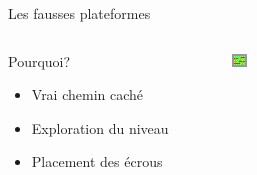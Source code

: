 \documentclass{beamer}
\begin{document}
{\begin{frame}{Les fausses plateformes}
    \begin{columns}
        \begin{block}{Pourquoi?}
            \begin{itemize}
                \item[\bullet] Vrai chemin caché
                \item[\bullet] Exploration du niveau
                \item[\bullet] Placement des écrous
            \end{itemize}
        \end{block}
        \begin{figure}
            \centering
            \includegraphics[width=1.0\textwidth]{fake_platforms}
        \end{figure}
    \end{columns}
\end{frame}

}
\end{document}
